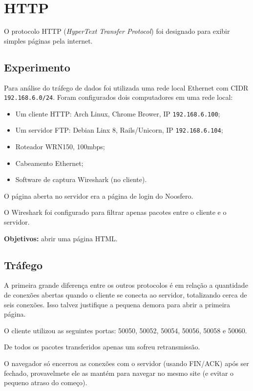 \chapter{HTTP}

O protocolo HTTP (\textit{HyperText Transfer Protocol}) foi designado para exibir simples páginas pela internet.

\section{Experimento}
Para análise do tráfego de dados foi utilizada uma rede local Ethernet com CIDR \texttt{192.168.6.0/24}. Foram configurados dois computadores em uma rede local:

\begin{itemize}
	\item Um cliente HTTP: Arch Linux, Chrome Brower, IP \texttt{192.168.6.100};
	\item Um servidor FTP: Debian Linx 8, Rails/Unicorn, IP \texttt{192.168.6.104};
	\item Roteador WRN150, 100mbps;
	\item Cabeamento Ethernet;
	\item Software de captura Wireshark (no cliente).
\end{itemize}

O página aberta no servidor era a página de login do Noosfero.

O Wireshark foi configurado para filtrar apenas pacotes entre o cliente e o servidor.

\textbf{Objetivos:} abrir uma página HTML.

\section{Tráfego}
A primeira grande diferença  entre os outros protocolos é em relação a quantidade de conexões abertas quando o cliente se conecta ao servidor, totalizando cerca de seis conexões. Isso talvez justifique a pequena demora para abrir a primeira página.

O cliente utilizou as seguintes portas: 50050, 50052, 50054, 50056, 50058 e 50060.

De todos os pacotes transferidos apenas um sofreu retransmissão.

O navegador só encerrou as conexões com o servidor (usando FIN/ACK) após ser fechado, provavelmete ele as mantém para navegar no mesmo site (e evitar o pequeno atraso do começo).
